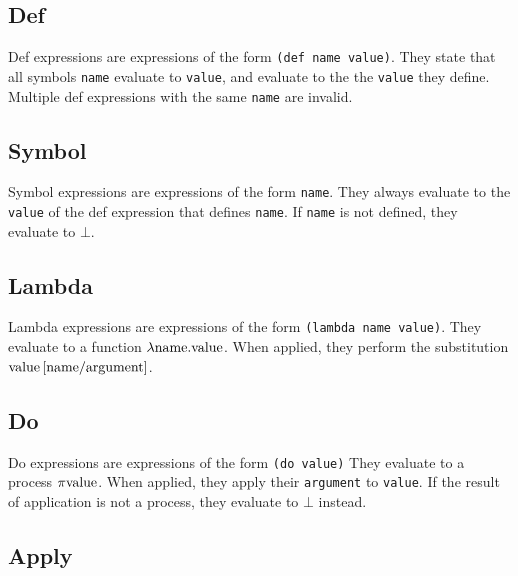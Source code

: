 \documentclass{article}
\begin{document}
    \begin{multicols}{2}
        \subsection{Def}\label{subsec:def}

        Def expressions are expressions of the form \lstinline$(def name value)$.
        They state that all symbols \lstinline$name$ evaluate to \lstinline$value$, and evaluate to the the \lstinline$value$ they define.
        Multiple def expressions with the same \lstinline$name$ are invalid.
        \newline

        \subsection{Symbol}\label{subsec:symbol}

        Symbol expressions are expressions of the form \lstinline$name$.
        They always evaluate to the \lstinline$value$ of the def expression that defines \lstinline$name$.
        If \lstinline$name$ is not defined, they evaluate to $\bot$.
        \newline

        \subsection{Lambda}\label{subsec:lambda}

        Lambda expressions are expressions of the form \lstinline$(lambda name value)$.
        They evaluate to a function $\lambda\lstinline{name}.\lstinline{value}$.
        When applied, they perform the substitution $\lstinline{value}\left[\lstinline{name}/\lstinline{argument}\right]$.
        \newline

        \subsection{Do}\label{subsec:do}

        Do expressions are expressions of the form \lstinline$(do value)$
        They evaluate to a process $\pi\lstinline{value}$.
        When applied, they apply their \lstinline$argument$ to \lstinline$value$.
        If the result of application is not a process, they evaluate to $\bot$ instead.
        \newline

        \subsection{Apply}\label{subsec:apply}


\end{multicols}
\end{document}
